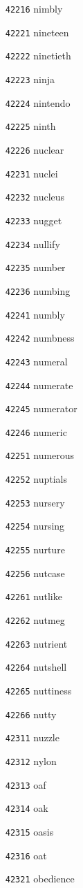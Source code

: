\documentclass[twoside,11pt]{article}
\begin{document}
\begin{multicols}{5}
\begin{enumerate}
\item[\texttt{42216}] nimbly
\item[\texttt{42221}] nineteen
\item[\texttt{42222}] ninetieth
\item[\texttt{42223}] ninja
\item[\texttt{42224}] nintendo
\item[\texttt{42225}] ninth
\item[\texttt{42226}] nuclear
\item[\texttt{42231}] nuclei
\item[\texttt{42232}] nucleus
\item[\texttt{42233}] nugget
\item[\texttt{42234}] nullify
\item[\texttt{42235}] number
\item[\texttt{42236}] numbing
\item[\texttt{42241}] numbly
\item[\texttt{42242}] numbness
\item[\texttt{42243}] numeral
\item[\texttt{42244}] numerate
\item[\texttt{42245}] numerator
\item[\texttt{42246}] numeric
\item[\texttt{42251}] numerous
\item[\texttt{42252}] nuptials
\item[\texttt{42253}] nursery
\item[\texttt{42254}] nursing
\item[\texttt{42255}] nurture
\item[\texttt{42256}] nutcase
\item[\texttt{42261}] nutlike
\item[\texttt{42262}] nutmeg
\item[\texttt{42263}] nutrient
\item[\texttt{42264}] nutshell
\item[\texttt{42265}] nuttiness
\item[\texttt{42266}] nutty
\item[\texttt{42311}] nuzzle
\item[\texttt{42312}] nylon
\item[\texttt{42313}] oaf
\item[\texttt{42314}] oak
\item[\texttt{42315}] oasis
\item[\texttt{42316}] oat
\item[\texttt{42321}] obedience

\end{enumerate}
\end{multicols}
\end{document}
